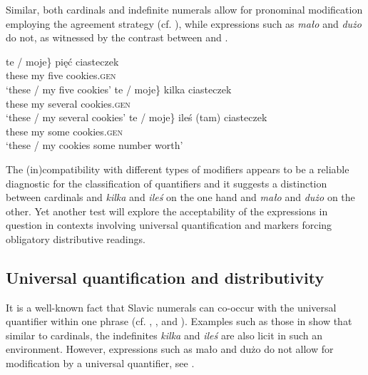 \documentclass[output=paper,
]{langscibook}
\begin{document}
\largerpage[2]
	\noindent Similar, both cardinals and indefinite numerals allow for pronominal modification employing the agreement strategy (cf. \citealt{miechowicz-mathiasen2011syntax}), while expressions such as \textit{mało} and \textit{dużo} do not, as witnessed by the contrast between  and .
	
	\ea \label{ex:pronominal-modifiers-cardinals} \ea \gll \minsp{\{} te / moje\} pięć ciasteczek\\
	{} these {} my five cookies.\textsc{gen}\\
	\glt `these / my five cookies'
	\ex \gll \minsp{\{} te / moje\} kilka ciasteczek\\
	{} these {} my several cookies.\textsc{gen}\\
	\glt `these / my several cookies'
	\ex \gll \minsp{\{} te / moje\} {ileś (tam)} ciasteczek\\
	{} these {} my some cookies.\textsc{gen}\\
	\glt `these / my cookies some number worth'
	\z
    \z

	\ea \label{ex:pronominal-modifiers-malo} 
	\z
    \z

	\noindent The (in)compatibility with different types of modifiers appears to be a reliable diagnostic for the classification of quantifiers and it suggests a distinction between cardinals and \textit{kilka} and \textit{ileś} on the one hand and \textit{mało} and \textit{dużo} on the other. Yet another test will explore the acceptability of the expressions in question in contexts involving universal quantification and markers forcing obligatory distributive readings.
	
	\subsection{Universal quantification and distributivity}\label{sec:universal-quantification-and-distributivity}

\largerpage[2]	
	It is a well-known fact that Slavic numerals can co-occur with the universal quantifier within one phrase (cf. \citealt{corbett1978universals}, \citealt{gvozdanovic1999some}, and \citealt{miechowicz-mathiasen2011syntax}). Examples such as those in  show that similar to cardinals, the indefinites \textit{kilka} and \textit{ileś} are also licit in such an environment. However, expressions such as mało and dużo do not allow for modification by a universal quantifier, see .
	
\end{document}
